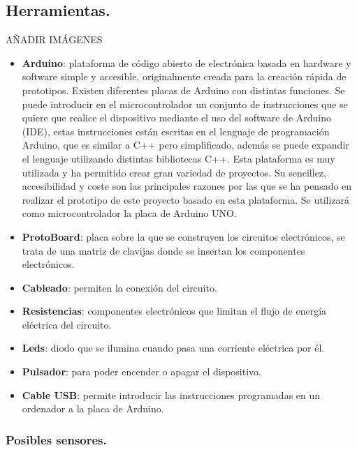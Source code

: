 \subsection{Herramientas.}
AÑADIR IMÁGENES
\begin{itemize}
\item \textbf{Arduino}:  plataforma de código abierto de electrónica basada en hardware y software simple y accesible, originalmente creada para la creación rápida de prototipos. Existen diferentes placas de Arduino con distintas funciones. Se puede introducir en el microcontrolador un conjunto de instrucciones que se quiere que realice el dispositivo mediante el uso del software de Arduino (IDE), estas instrucciones están escritas en el lenguaje de programación Arduino, que es similar a C++ pero simplificado, además se puede expandir el lenguaje utilizando distintas bibliotecas C++. Esta plataforma es muy utilizada y ha permitido crear gran variedad de proyectos. Su sencillez, accesibilidad y coste son las principales razones por las que se ha pensado en realizar el prototipo de este proyecto basado en esta plataforma. Se utilizará como microcontrolador la placa de Arduino UNO.

\item \textbf{ProtoBoard}: placa sobre la que se construyen los circuitos electrónicos, se trata de una matriz de clavijas donde se insertan los componentes electrónicos.

\item \textbf{Cableado}: permiten la conexión del circuito.

\item \textbf{Resistencias}: componentes electrónicos que limitan el flujo de energía eléctrica del circuito.

\item \textbf{Leds}: diodo que se ilumina cuando pasa una corriente eléctrica por él.

\item \textbf{Pulsador}: para poder encender o apagar el dispositivo.

\item \textbf{Cable USB}: permite introducir las instrucciones programadas en un ordenador a la placa de Arduino.

\end{itemize}


\subsubsection{Posibles sensores.}

